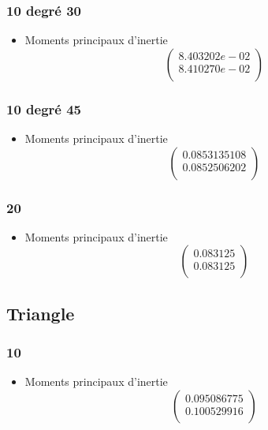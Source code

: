 \documentclass[a4paper,12pt]{report}
\begin{document}
\subsubsection*{10 degré 30}
\begin{itemize}

\item Moments principaux d'inertie
\[
   \left (
   \begin{array}{c}
      8.403202e-02 \\
      8.410270e-02 \\
   \end{array}
   \right )
\]

\end{itemize}

\subsubsection*{10 degré 45}
\begin{itemize}

\item Moments principaux d'inertie
\[
   \left (
   \begin{array}{c}
      0.0853135108 \\
      0.0852506202 \\
   \end{array}
   \right )
\]

\end{itemize}

\subsubsection*{20}
\begin{itemize}
\item Moments principaux d'inertie
\[
   \left (
   \begin{array}{c}
      0.083125 \\
      0.083125 \\
   \end{array}
   \right )
\]

\end{itemize}


\subsection*{Triangle}
\subsubsection*{10}
\begin{itemize}

\item Moments principaux d'inertie
\[
   \left (
   \begin{array}{c}
      0.095086775 \\
      0.100529916 \\
   \end{array}
   \right )
\]

\end{itemize}
\end{document}
